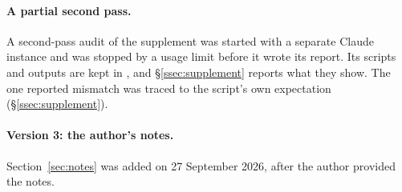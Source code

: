 \paragraph{A partial second pass.}
A second-pass audit of the supplement was started with a separate Claude instance and was stopped by a usage limit before it wrote its report. Its scripts and outputs are kept in , and §\ref{ssec:supplement} reports what they show. The one reported mismatch was traced to the script's own expectation (§\ref{ssec:supplement}).

\paragraph{Version 3: the author's notes.}
Section~\ref{sec:notes} was added on 27 September 2026, after the author provided the notes.
